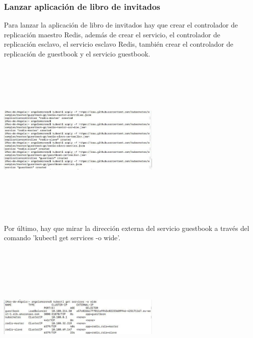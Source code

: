 \documentclass[english,runningheads,a4paper]{llncs}[2018/03/10]
\newenvironment{nscenter}
 {\parskip=0pt\par\nopagebreak\centering}
 {\par\noindent\ignorespacesafterend}
\begin{document}
\subsubsection*{Lanzar aplicación de libro de invitados}
Para lanzar la aplicación de libro de invitados hay que crear el controlador de 
replicación maestro Redis, además de crear el servicio, el controlador de 
replicación esclavo, el servicio esclavo Redis, también crear el controlador de 
replicación de guestbook y el servicio guestbook.
\newline
\begin{nscenter}
\includegraphics[width=8cm,height=8cm,keepaspectratio]{./Contenedores/AWS/23.jpg}
\end{nscenter}
\newline
Por último, hay que mirar la dirección externa del servicio guestbook a través 
del comando 'kubectl get services -o wide'.
\includegraphics[width=8cm,height=8cm,keepaspectratio]{./Contenedores/AWS/2.jpg}
\end{document}
